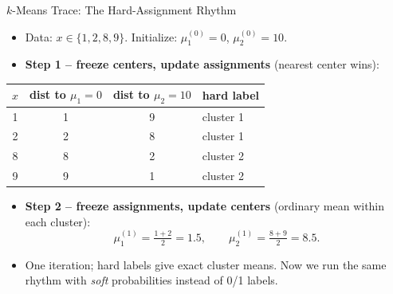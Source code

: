 \begin{frame}{$k$-Means Trace: The Hard-Assignment Rhythm}
\small
\begin{itemize}
  \item Data: $x \in \{1, 2, 8, 9\}$.  Initialize: $\mu_1^{(0)} = 0$, $\mu_2^{(0)} = 10$.
  \item \textbf{Step 1 -- freeze centers, update assignments} (nearest center wins):
\end{itemize}

\pause
\begin{center}
\begin{tabular}{cccl}
\hline
$x$ & dist to $\mu_1 = 0$ & dist to $\mu_2 = 10$ & hard label \\
\hline
1 & 1 & 9 & cluster 1 \\
2 & 2 & 8 & cluster 1 \\
8 & 8 & 2 & cluster 2 \\
9 & 9 & 1 & cluster 2 \\
\hline
\end{tabular}
\end{center}

\pause
\begin{itemize}
  \item \textbf{Step 2 -- freeze assignments, update centers} (ordinary mean within each cluster):
  \[
    \mu_1^{(1)} = \tfrac{1+2}{2} = 1.5, \qquad \mu_2^{(1)} = \tfrac{8+9}{2} = 8.5.
  \]
  \item One iteration; hard labels give exact cluster means.  Now we run the same rhythm with \emph{soft} probabilities instead of 0/1 labels.
\end{itemize}
\end{frame}

